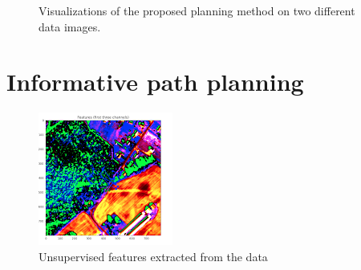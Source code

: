 \begin{figure}[h]
    \hfill
    \caption{Visualizations of the proposed planning method on two different data images.}
    \label{fig:res_unpairqual}
\end{figure}

\section{Informative path planning}

\begin{figure}
    \centering
    \includegraphics[width=\textwidth]{figs/results/feature_extraction/Screenshot from 2023-05-19 10-03-18.png}
    \caption{Unsupervised features extracted from the data}
    \label{fig:res_unsupervised_feature_qual}
\end{figure}

